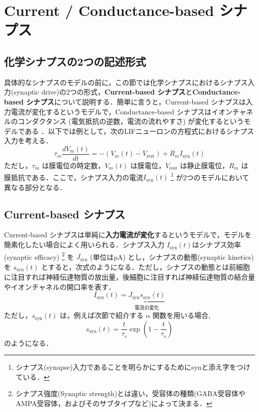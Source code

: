 \section{Current / Conductance-based シナプス
}
\subsection{化学シナプスの2つの記述形式
}
具体的なシナプスのモデルの前に，この節では化学シナプスにおけるシナプス入力(synaptic drive)の2つの形式，\textbf{Current-based シナプス}と\textbf{Conductance-based シナプス}について説明する．簡単に言うと，Current-based シナプスは入力電流が変化するというモデルで，Conductance-based シナプスはイオンチャネルのコンダクタンス (電気抵抗の逆数，電流の流れやすさ) が変化するというモデルである \citep{Cavallari2014-jx}．以下では例として，次のLIFニューロンの方程式におけるシナプス入力を考える．
\begin{equation}
\tau_m \frac{dV_{m}(t)}{dt}=-(V_{m}(t)-V_\text{rest})+R_m I_{\text{syn}}(t)    
\end{equation}
ただし，$\tau_m$ は膜電位の時定数，$V_m(t)$ は膜電位，$V_\text{rest}$ は静止膜電位，$R_m$ は膜抵抗である．ここで，シナプス入力の電流$I_{\text{syn}}(t)$ \footnote{シナプス(synapse)入力であることを明らかにするためにsynと添え字をつけている．} が2つのモデルにおいて異なる部分となる．
\subsection{Current-based シナプス
}
Current-based シナプスは単純に\textbf{入力電流が変化}するというモデルで，モデルを簡素化したい場合によく用いられる．シナプス入力 $I_{\text{syn}}(t)$はシナプス効率(synaptic efficacy) \footnote{シナプス強度(Synaptic strength)とは違い，受容体の種類(GABA受容体やAMPA受容体，およびそのサブタイプなど)によって決まる．} を $J_{\text{syn}}$ (単位はpA) とし，シナプスの動態(synaptic kinetics)を $s_{\text{syn}}(t)$ とすると，次式のようになる．ただし，シナプスの動態とは前細胞に注目すれば神経伝達物質の放出量，後細胞に注目すれば神経伝達物質の結合量やイオンチャネルの開口率を表す．
\begin{equation}
I_{\text{syn}}(t)=\underbrace{J_{\text{syn}}s_{\text{syn}}(t)}_{電流の変化}    
\end{equation}
ただし，$s_{\text{syn}}(t)$ は，例えば次節で紹介する $\alpha$ 関数を用いる場合, 
\begin{equation}
s_{\text{syn}}(t)=\dfrac{t}{\tau_s} \exp \left(1-\dfrac{t}{\tau_s}\right)    
\end{equation}
のようになる．
